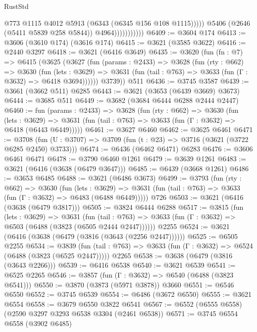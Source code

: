 \begin{lexlean}{RustStd}
\begin{coremodule}
                                @773
                                @1115
                                @4012
                                @5913
                                (@6343 (@6345 @156 @108 @1115)))))
                          @5406
                          (@2646 (@5411 @5839 @258 @5844))
                          @4964)))))))))))
@6409 := @3604 @174
@6413 := @3606 (@3610 @174) (@3616 @174)
@6415 := @3621 (@3585 @3622)
@6416 := @2440 @3297
@6418 := @3621 (@6416 @3649)
@6435 := @3620
    (fun (fn : @7) =>
    @6415
      (@3625
        (@3627
          (fun (params : @2433) =>
          @3628
            (fun (rty : @662) =>
            @3630
              (fun (lets : @3629) =>
              @3631 (fun (tail : @763) => @3633 (fun (Γ : @3632) => @6418 @3694))))))
        @3739))
    @511
@6436 := @3745 @3587
@6439 := @3661 (@3662 @511) @6285
@6443 := @3621 (@3653 (@6439 @3669) @3673)
@6444 := @3685 @511
@6449 := @3682 (@3684 @6444 @6288 @2444 @2447)
@6460 := fun (params : @2433) =>
  @3628
    (fun (rty : @662) =>
    @3630
      (fun (lets : @3629) =>
      @3631 (fun (tail : @763) => @3633 (fun (Γ : @3632) => @6418 (@6443 @6449)))))
@6461 := @3627 @6460
@6462 := @3625 @6461
@6471 := @3708 (fun (U : @3707) => @3709 (fun (t : @23) => @3716 (@3621 (@3722 @6285 @2450) @3733)))
@6474 := @6436 (@6462 @6471) @6283
@6476 := @3606 @6461 @6471
@6478 := @3790 @6460 @1261
@6479 := @3639 @1261
@6483 := @3621 (@6416 (@3638 (@6479 @3647)))
@6485 := @6439 (@3668 @1261)
@6486 := @3653 @6485
@6488 := @3621 (@6486 @3673)
@6499 := @3793
    (fun (rty : @662) =>
    @3630
      (fun (lets : @3629) =>
      @3631 (fun (tail : @763) => @3633 (fun (Γ : @3632) => @6483 (@6488 @6449)))))
    @726
@6503 := @3621 (@6416 (@3638 (@6479 @3817)))
@6505 := @3824 @6444 @6288
@6517 := @3815
    (fun (lets : @3629) =>
    @3631
      (fun (tail : @763) => @3633 (fun (Γ : @3632) => @6503 (@6488 (@3823 (@6505 @2444 @2447))))))
    @2255
@6524 := @3621 (@6416 (@3638 (@6479 (@3816 (@3643 (@2256 @2447))))))
@6525 := @6505 @2255
@6534 := @3839
    (fun (tail : @763) => @3633 (fun (Γ : @3632) => @6524 (@6488 (@3823 (@6525 @2447)))))
    @2265
@6538 := @3638 (@6479 (@3816 (@3643 @2266)))
@6539 := @6416 @6538
@6540 := @3621 @6539
@6541 := @6525 @2265
@6546 := @3857 (fun (Γ : @3632) => @6540 (@6488 (@3823 @6541)))
@6550 := @3870 (@3873 (@5971 @3878)) @3660
@6551 := @6546 @6550
@6552 := @3745 @6539
@6554 := @6486 (@3672 @6550)
@6555 := @3621 @6554
@6558 := @3679 @6550 @3822 @6541
@6567 := @6552 (@6555 @6558) (@2590 @3297 @3293 @6538 @3304 (@2461 @6538))
@6571 := @3745 @6554 @6558 (@3902 @6485)

\end{coremodule}
\end{lexlean}
